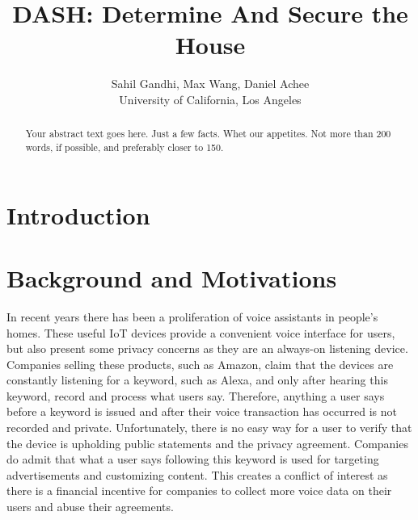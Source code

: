 \documentclass[letterpaper,twocolumn,10pt]{article}
\begin{document}

\date{}

\title{\Large \bf DASH: Determine And Secure the House}

\author{
{\rm Sahil Gandhi, Max Wang, Daniel Achee}\\
University of California, Los Angeles
} %

\maketitle

\begin{abstract}
Your abstract text goes here. Just a few facts. Whet our appetites.
Not more than 200 words, if possible, and preferably closer to 150.
\end{abstract}

\section{Introduction}


\section{Background and Motivations}

In recent years there has been a proliferation of voice assistants in people’s homes. These useful IoT devices provide a convenient voice interface for users, but also present some privacy concerns as they are an always-on listening device. Companies selling these products, such as Amazon, claim that the devices are constantly listening for a keyword, such as Alexa, and only after hearing this keyword, record and process what users say. Therefore, anything a user says before a keyword is issued and after their voice transaction has occurred is not recorded and private. Unfortunately, there is no easy way for a user to verify that the device is upholding public statements and the privacy agreement. Companies do admit that what a user says following this keyword is used for targeting advertisements and customizing content. This creates a conflict of interest as there is a financial incentive for companies to collect more voice data on their users and abuse their agreements.
\end{document}
